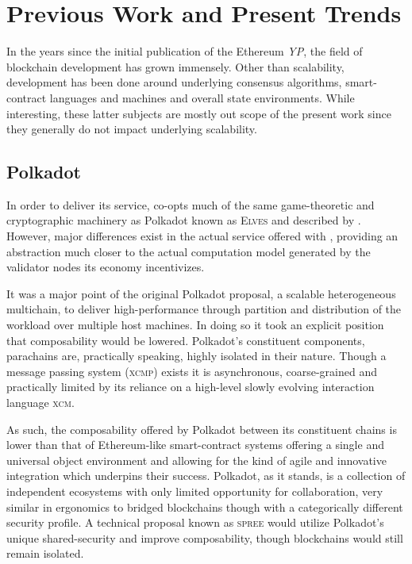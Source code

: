 \section{Previous Work and Present Trends}\label{sec:previouswork}

In the years since the initial publication of the Ethereum \emph{YP}, the field of blockchain development has grown immensely. Other than scalability, development has been done around underlying consensus algorithms, smart-contract languages and machines and overall state environments. While interesting, these latter subjects are mostly out scope of the present work since they generally do not impact underlying scalability.

\subsection{Polkadot}

In order to deliver its service, \Jam co-opts much of the same game-theoretic and cryptographic machinery as Polkadot known as \textsc{Elves} and described by \cite{cryptoeprint:2024/961}. However, major differences exist in the actual service offered with \Jam, providing an abstraction much closer to the actual computation model generated by the validator nodes its economy incentivizes.

It was a major point of the original Polkadot proposal, a scalable heterogeneous multichain, to deliver high-performance through partition and distribution of the workload over multiple host machines. In doing so it took an explicit position that composability would be lowered. Polkadot's constituent components, parachains are, practically speaking, highly isolated in their nature. Though a message passing system (\textsc{xcmp}) exists it is asynchronous, coarse-grained and practically limited by its reliance on a high-level slowly evolving interaction language \textsc{xcm}.

As such, the composability offered by Polkadot between its constituent chains is lower than that of Ethereum-like smart-contract systems offering a single and universal object environment and allowing for the kind of agile and innovative integration which underpins their success. Polkadot, as it stands, is a collection of independent ecosystems with only limited opportunity for collaboration, very similar in ergonomics to bridged blockchains though with a categorically different security profile. A technical proposal known as \textsc{spree} would utilize Polkadot's unique shared-security and improve composability, though blockchains would still remain isolated.

